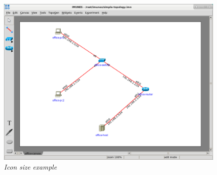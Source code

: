\begin{figure}[H]
	\centering
	\vspace{10pt}
	\includegraphics[width=\textwidth]{./images/icon_size_example.png}
	\caption{\emph{Icon size example}}
	\label{fig:icon_size_example}
\end{figure}

